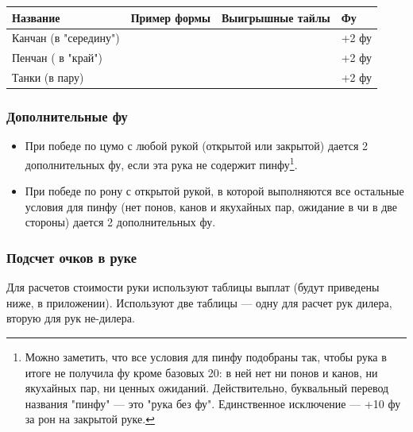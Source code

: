 \noindent\begin{tabular}{C{3cm}C{5cm}C{3cm}C{3cm}}
\toprule
	Название  &
	Пример формы &
	Выигрышные тайлы &
	Фу \\
\midrule
		\rule[0ex]{0pt}{5ex} Канчан \newline (в "середину") \newline &
	 &
	 &
	+2 фу \\
\midrule
	\rule[0ex]{0pt}{5ex} Пенчан \newline ( в "край") \newline &
	 &
	 &
	+2 фу \\
\midrule
	\rule[0ex]{0pt}{5ex} Танки \newline (в пару) \newline &
	 &
	 &
	+2 фу \\
\bottomrule
\end{tabular}

\subsubsection{Дополнительные фу}

\begin{itemize}
	\item При победе по цумо с любой рукой (открытой или закрытой) дается 2 дополнительных фу, если эта рука не содержит пинфу\footnote{Можно заметить, что все условия для пинфу подобраны так, чтобы рука в итоге не получила фу кроме базовых 20: в ней нет ни понов и канов, ни якухайных пар, ни ценных ожиданий. Действительно, буквальный перевод названия "пинфу" --- это "рука без фу". Единственное исключение --- +10 фу за рон на закрытой руке.}. 	
	\item При победе по рону с открытой рукой, в которой выполняются все остальные условия для пинфу (нет понов, канов и якухайных пар, ожидание в чи в две стороны) дается 2 дополнительных фу. 
\end{itemize}

\subsubsection{Подсчет очков в руке}

Для расчетов стоимости руки используют таблицы выплат (будут приведены ниже, в приложении). Используют две таблицы --- одну для расчет рук дилера, вторую для рук не-дилера.

